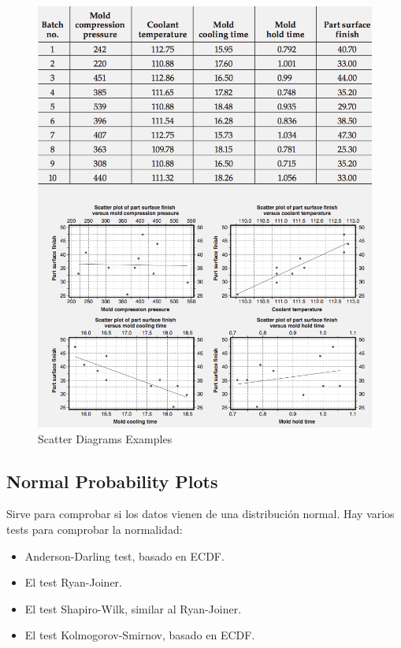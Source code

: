 \documentclass[oneside]{book}
\begin{document}
\begin{figure}[H]
	\centering
	\includegraphics[width=150mm]{imagenes/ScatterDiagramsExamples.png}
	\caption{Scatter Diagrams Examples}
	\label{fig:ScatterDiagramsExamples}
\end{figure}

\subsection{Normal Probability Plots}

Sirve para comprobar si los datos vienen de una distribución normal. Hay varios tests para comprobar la normalidad:

\begin{itemize}
	\item Anderson-Darling test, basado en ECDF.
	\item El test Ryan-Joiner.
	\item El test Shapiro-Wilk, similar al Ryan-Joiner.
	\item El test Kolmogorov-Smirnov, basado en ECDF.
\end{itemize}
\end{document}
